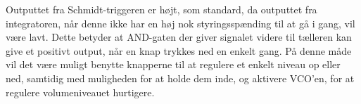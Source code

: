 Outputtet fra Schmidt-triggeren er højt, som standard, da outputtet fra integratoren, når denne ikke har en høj nok styringsspænding til at gå i gang, vil være lavt. Dette betyder at AND-gaten der giver signalet videre til tælleren kan give et positivt output, når en knap trykkes ned en enkelt gang. På denne måde vil det være muligt benytte knapperne til at regulere et enkelt niveau op eller ned, samtidig med muligheden for at holde dem inde, og aktivere VCO'en, for at regulere volumeniveauet hurtigere.





